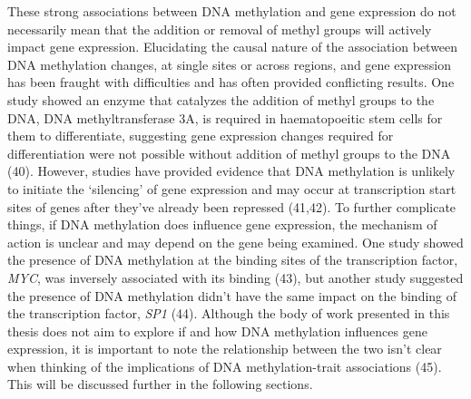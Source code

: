 \documentclass[11pt,oneside]{bristolthesis}
\begin{document}
These strong associations between DNA methylation and gene expression do not necessarily mean that the addition or removal of methyl groups will actively impact gene expression. Elucidating the causal nature of the association between DNA methylation changes, at single sites or across regions, and gene expression has been fraught with difficulties and has often provided conflicting results. One study showed an enzyme that catalyzes the addition of methyl groups to the DNA, DNA methyltransferase 3A, is required in haematopoeitic stem cells for them to differentiate, suggesting gene expression changes required for differentiation were not possible without addition of methyl groups to the DNA (40). However, studies have provided evidence that DNA methylation is unlikely to initiate the `silencing' of gene expression and may occur at transcription start sites of genes after they've already been repressed (41,42). To further complicate things, if DNA methylation does influence gene expression, the mechanism of action is unclear and may depend on the gene being examined. One study showed the presence of DNA methylation at the binding sites of the transcription factor, \emph{MYC}, was inversely associated with its binding (43), but another study suggested the presence of DNA methylation didn't have the same impact on the binding of the transcription factor, \emph{SP1} (44). Although the body of work presented in this thesis does not aim to explore if and how DNA methylation influences gene expression, it is important to note the relationship between the two isn't clear when thinking of the implications of DNA methylation-trait associations (45). This will be discussed further in the following sections.
\end{document}
